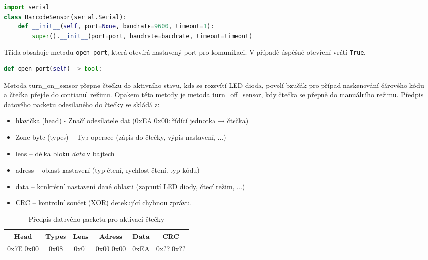 \begin{lstlisting}[language=python,breaklines=true, frame=single]
import serial
class BarcodeSensor(serial.Serial):
    def __init__(self, port=None, baudrate=9600, timeout=1):
        super().__init__(port=port, baudrate=baudrate, timeout=timeout)
\end{lstlisting}
\bigskip
Třída obsahuje metodu \texttt{open\_port}, která otevírá nastavený port pro komunikaci. 
V případě úspěšné otevření vrátí \texttt{True}. 

\begin{lstlisting}[language=Python,breaklines=false, frame=single]
def open_port(self) -> bool:
\end{lstlisting}

\bigskip
Metoda turn\_on\_sensor přepne čtečku do aktivního stavu, kde se rozsvítí LED dioda, povolí bzučák pro případ naskenování čárového kódu a čtečka přejde do contianul režimu. Opakem této metody je metoda turn\_off\_sensor, kdy čtečka se přepně do manuálního režimu. Předpis datového packetu odesilaného do čtečky se skládá z:

\begin{itemize}
    \item hlavička (head) - Značí odesílatele dat (0xEA 0x00: řídící jednotka → čtečka)
    \item Zone byte (types) – Typ operace (zápis do čtečky, výpis nastavení, ...)
    \item lens – délka bloku \textit{data} v bajtech
    \item adress – oblast nastavení (typ čtení, rychlost čtení, typ kódu)
    \item data – konkrétní nastavení dané oblasti (zapnutí LED diody, čtecí režim, ...)
    \item CRC – kontrolní součet (XOR) detekující chybnou zprávu. 
\end{itemize}

\begin{table}[H]
    \centering
    \begin{tabular}{|c|c|c|c|c|c|}
         \hline
         Head & Types & Lens & Adress & Data & CRC\\ \hline
         0x7E 0x00 & 0x08 & 0x01 & 0x00 0x00 & 0xEA & 0x?? 0x??\\
         \hline
    \end{tabular}
    \caption{Předpis datového packetu pro aktivaci čtečky}
    \label{tab:my_label}
\end{table}

